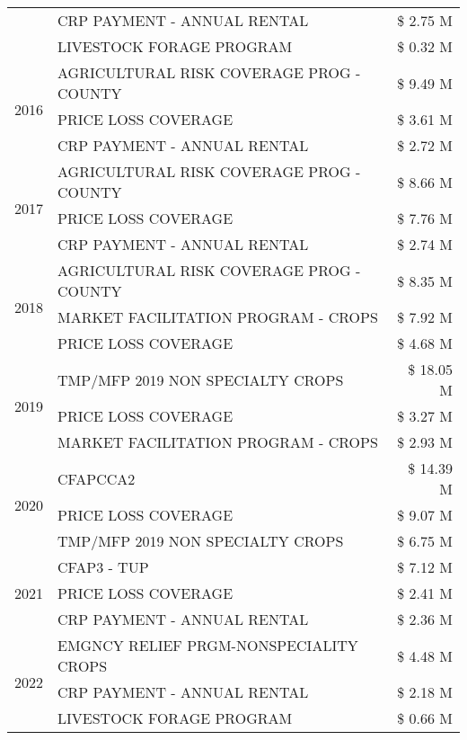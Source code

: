 \begin{tabular}{llr}
 & CRP PAYMENT - ANNUAL RENTAL & \$ 2.75 M \\
 & LIVESTOCK FORAGE PROGRAM & \$ 0.32 M \\
\cline{1-3}
\multirow[t]{3}{*}{2016} & AGRICULTURAL RISK COVERAGE PROG - COUNTY & \$ 9.49 M \\
 & PRICE LOSS COVERAGE & \$ 3.61 M \\
 & CRP PAYMENT - ANNUAL RENTAL & \$ 2.72 M \\
\cline{1-3}
\multirow[t]{3}{*}{2017} & AGRICULTURAL RISK COVERAGE PROG - COUNTY & \$ 8.66 M \\
 & PRICE LOSS COVERAGE & \$ 7.76 M \\
 & CRP PAYMENT - ANNUAL RENTAL & \$ 2.74 M \\
\cline{1-3}
\multirow[t]{3}{*}{2018} & AGRICULTURAL RISK COVERAGE PROG - COUNTY & \$ 8.35 M \\
 & MARKET FACILITATION PROGRAM - CROPS & \$ 7.92 M \\
 & PRICE LOSS COVERAGE & \$ 4.68 M \\
\cline{1-3}
\multirow[t]{3}{*}{2019} & TMP/MFP 2019 NON SPECIALTY CROPS & \$ 18.05 M \\
 & PRICE LOSS COVERAGE & \$ 3.27 M \\
 & MARKET FACILITATION PROGRAM - CROPS & \$ 2.93 M \\
\cline{1-3}
\multirow[t]{3}{*}{2020} & CFAPCCA2 & \$ 14.39 M \\
 & PRICE LOSS COVERAGE & \$ 9.07 M \\
 & TMP/MFP 2019 NON SPECIALTY CROPS & \$ 6.75 M \\
\cline{1-3}
\multirow[t]{3}{*}{2021} & CFAP3 - TUP & \$ 7.12 M \\
 & PRICE LOSS COVERAGE & \$ 2.41 M \\
 & CRP PAYMENT - ANNUAL RENTAL & \$ 2.36 M \\
\cline{1-3}
\multirow[t]{3}{*}{2022} & EMGNCY RELIEF PRGM-NONSPECIALITY CROPS & \$ 4.48 M \\
 & CRP PAYMENT - ANNUAL RENTAL & \$ 2.18 M \\
 & LIVESTOCK FORAGE PROGRAM & \$ 0.66 M \\
\cline{1-3}
\bottomrule
\end{tabular}
